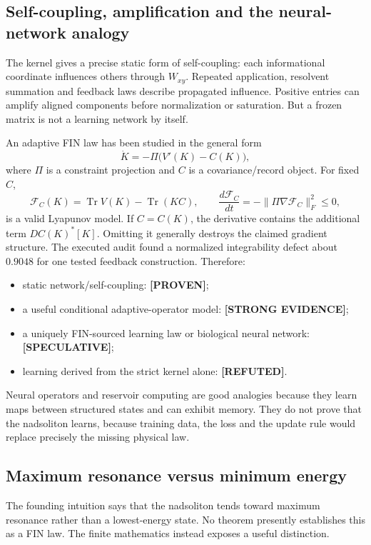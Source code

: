 \documentclass[11pt,a4paper]{article}
\theoremstyle{definition}
\theoremstyle{remark}
\newcommand{\Tr}{\operatorname{Tr}}
\newcommand{\status}[2]{\textcolor{#1}{\textbf{[#2]}}}
\newcommand{\proven}{\status{fingreen}{PROVEN}}
\newcommand{\strong}{\status{finblue}{STRONG EVIDENCE}}
\newcommand{\speculative}{\status{finpurple}{SPECULATIVE}}
\newcommand{\refuted}{\status{finred}{REFUTED}}
\begin{document}
\subsection{Self-coupling, amplification and the neural-network analogy}

The kernel gives a precise static form of self-coupling: each informational coordinate influences others through $W_{xy}$. Repeated application, resolvent summation and feedback laws describe propagated influence. Positive entries can amplify aligned components before normalization or saturation. But a frozen matrix is not a learning network by itself.

An adaptive FIN law has been studied in the general form
\[
\dot K=-\Pi\bigl(V'(K)-C(K)\bigr),
\]
where $\Pi$ is a constraint projection and $C$ is a covariance/record object. For fixed $C$,
\[
\mathcal F_C(K)=\Tr V(K)-\Tr(KC),\qquad
\frac{d\mathcal F_C}{dt}=-\|\Pi\nabla\mathcal F_C\|_F^2\le0,
\]
is a valid Lyapunov model. If $C=C(K)$, the derivative contains the additional term $DC(K)^*[K]$. Omitting it generally destroys the claimed gradient structure. The executed audit found a normalized integrability defect about $0.9048$ for one tested feedback construction. Therefore:

\begin{itemize}
\item static network/self-coupling: \proven;
\item a useful conditional adaptive-operator model: \strong;
\item a uniquely FIN-sourced learning law or biological neural network: \speculative;
\item learning derived from the strict kernel alone: \refuted.
\end{itemize}

Neural operators and reservoir computing are good analogies because they learn maps between structured states and can exhibit memory. They do not prove that the nadsoliton learns, because training data, the loss and the update rule would replace precisely the missing physical law.

\subsection{Maximum resonance versus minimum energy}

The founding intuition says that the nadsoliton tends toward maximum resonance rather than a lowest-energy state. No theorem presently establishes this as a FIN law. The finite mathematics instead exposes a useful distinction.
\end{document}
